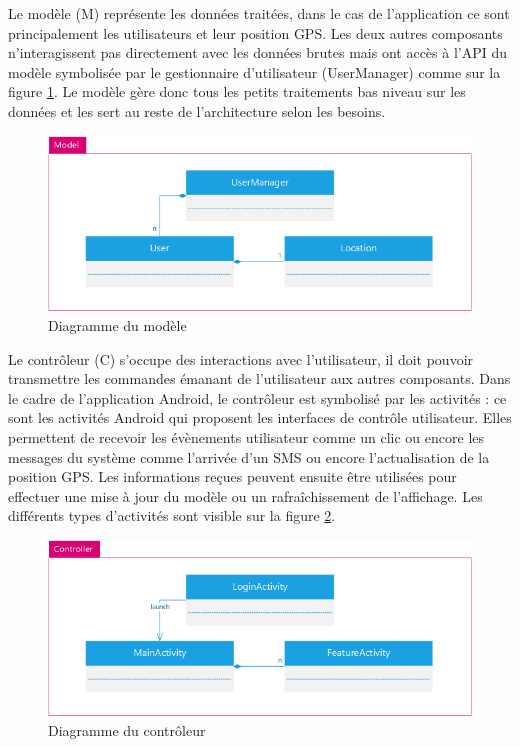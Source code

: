 Le modèle (M) représente les données traitées, dans le cas de l’application ce sont principalement les utilisateurs et leur position GPS. Les deux autres composants n’interagissent pas directement avec les données brutes mais ont accès à l’API du modèle symbolisée par le gestionnaire d’utilisateur (UserManager) comme sur la figure \ref{model}. Le modèle gère donc tous les petits traitements bas niveau sur les données et les sert au reste de l’architecture selon les besoins.

\begin{figure}[H]
    \centering
    \includegraphics[width=\textwidth]{./img/android-model.png}
    \caption{Diagramme du modèle}
    \label{model}
\end{figure}

Le contrôleur (C) s’occupe des interactions avec l’utilisateur, il doit pouvoir transmettre les commandes émanant de l’utilisateur aux autres composants. Dans le cadre de l’application Android, le contrôleur est symbolisé par les activités : ce sont les activités Android qui proposent les interfaces de contrôle utilisateur. Elles permettent de recevoir les évènements utilisateur comme un clic ou encore les messages du système comme l’arrivée d’un SMS ou encore l’actualisation de la position GPS. Les informations reçues peuvent ensuite être utilisées pour effectuer une mise à jour du modèle ou un rafraîchissement de l’affichage. Les différents types d’activités sont visible sur la figure \ref{controller}.

\begin{figure}[H]
    \centering
    \includegraphics[width=\textwidth]{./img/android-controller.png}
    \caption{Diagramme du contrôleur}
    \label{controller}
\end{figure}


